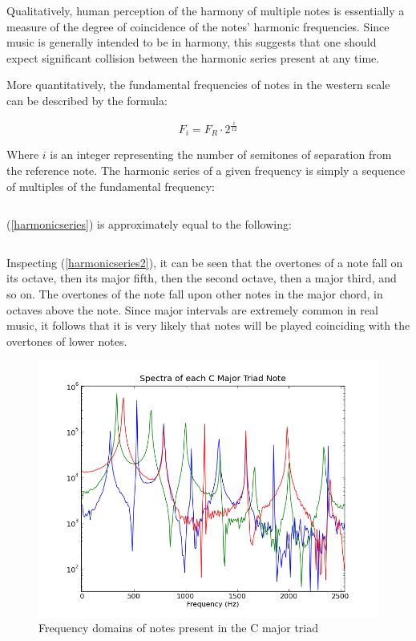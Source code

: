 \documentclass[twocolumn]{article}
\begin{document}
Qualitatively, human perception of the harmony of multiple notes is essentially a measure of the degree of coincidence of the notes' harmonic frequencies.  Since music is generally intended to be in harmony, this suggests that one should expect significant collision between the harmonic series present at any time.

More quantitatively, the fundamental frequencies of notes in the western scale can be described by the formula:

\begin{equation}
F_i = F_R \cdotp 2^{\frac{i}{12}}
\label{scale}
\end{equation}

Where $i$ is an integer representing the number of semitones of separation from the reference note.  The harmonic series of a given frequency is simply a sequence of multiples of the fundamental frequency:

\begin{equation}
[F_o, 2 \cdotp F_o, 3 \cdotp F_o, \cdots]
\label{harmonicseries}
\end{equation}

(\ref{harmonicseries}) is approximately equal to the following:

\begin{equation}
[F_o, F_o \cdotp 2^{\frac{12}{12}}, F_o \cdotp 2^{\frac{19}{12}}, F_o \cdotp 2^{\frac{24}{12}}, F_o \cdotp 2^{\frac{28}{12}}, \cdots]
\label{harmonicseries2}
\end{equation}

Inspecting (\ref{harmonicseries2}), it can be seen that the overtones of a note fall on its octave, then its major fifth, then the second octave, then a major third, and so on.  The overtones of the note fall upon other notes in the major chord, in octaves above the note.  Since major intervals are extremely common in real music, it follows that it is very likely that notes will be played coinciding with the overtones of lower notes.

\begin{figure}[htb]
 \includegraphics[scale=0.39]{cmajor-decomp.png}
 \caption{Frequency domains of notes present in the C major triad}
 \label{cmajor-decomp}
\end{figure}
\end{document}
